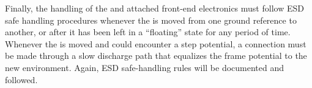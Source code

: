 Finally, the handling of the  and attached front-end electronics must follow ESD safe handling procedures whenever the  is moved from one ground reference to another, or after it has been left in a ``floating'' state for any period of time.  Whenever the  is moved and could encounter a step potential, a connection must be made through a slow discharge path that equalizes the  frame potential to the new environment.  Again, ESD safe-handling rules will be documented and followed.

